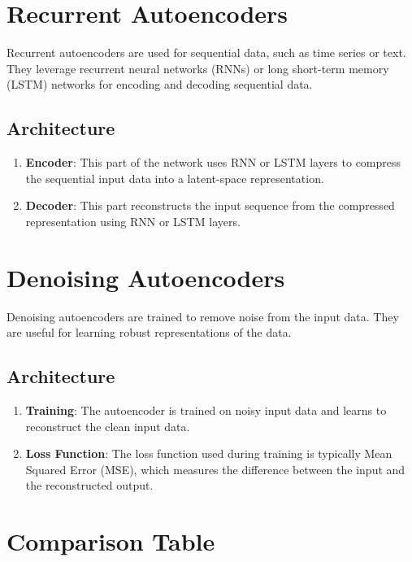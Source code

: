 \documentclass[
  letterpaper,
  DIV=11,
  numbers=noendperiod]{scrreprt}
\begin{document}
\section{Recurrent Autoencoders}\label{recurrent-autoencoders}

Recurrent autoencoders are used for sequential data, such as time series
or text. They leverage recurrent neural networks (RNNs) or long
short-term memory (LSTM) networks for encoding and decoding sequential
data.

\subsection{Architecture}\label{architecture-3}

\begin{enumerate}
\def\labelenumi{\arabic{enumi}.}
\item
  \textbf{Encoder}: This part of the network uses RNN or LSTM layers to
  compress the sequential input data into a latent-space representation.
\item
  \textbf{Decoder}: This part reconstructs the input sequence from the
  compressed representation using RNN or LSTM layers.
\end{enumerate}

\section{Denoising Autoencoders}\label{denoising-autoencoders}

Denoising autoencoders are trained to remove noise from the input data.
They are useful for learning robust representations of the data.

\subsection{Architecture}\label{architecture-4}

\begin{enumerate}
\def\labelenumi{\arabic{enumi}.}
\item
  \textbf{Training}: The autoencoder is trained on noisy input data and
  learns to reconstruct the clean input data.
\item
  \textbf{Loss Function}: The loss function used during training is
  typically Mean Squared Error (MSE), which measures the difference
  between the input and the reconstructed output.
\end{enumerate}

\section{Comparison Table}\label{comparison-table-1}
\end{document}
